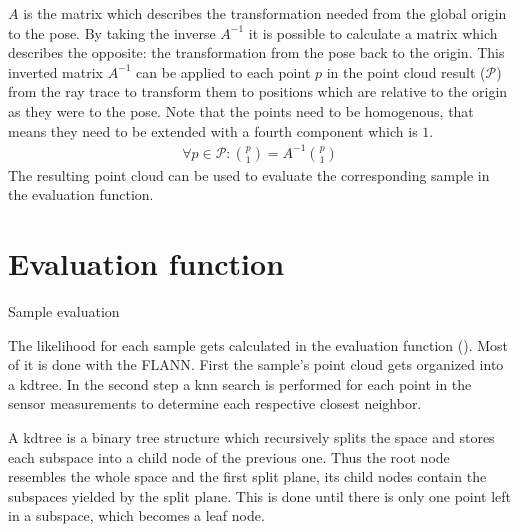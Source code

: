 \documentclass[Thesis.tex]{subfiles}
\begin{document}
$A$ is the matrix which describes the transformation needed from the global origin to the pose. By taking the inverse $A^{-1}$ it is possible to calculate a matrix which describes the opposite: the transformation from the pose back to the origin. This inverted matrix $A^{-1}$ can be applied to each point $p$ in the point cloud result ($\mathcal{P}$) from the ray trace to transform them to positions which are relative to the origin as they were to the pose. Note that the points need to be homogenous, that means they need to be extended with a fourth component which is $1$.
%
\begin{align}
  \forall p \in \mathcal{P}: \genfrac{(}{)}{0pt}{0}{p}{1} = A^{-1} \genfrac{(}{)}{0pt}{0}{p}{1}
\end{align}
%
The resulting point cloud can be used to evaluate the corresponding sample in the evaluation function.
%
%
%
\section{Evaluation function}
%
\begin{algorithm}[!htp]
\caption{Sample evaluation}
\label{alg:eval}

\end{algorithm}
The likelihood for each sample gets calculated in the evaluation function (). Most of it is done with the \gls{FLANN}. First the sample's point cloud gets organized into a \gls{kdtree}. In the second step a \gls{knn} search is performed for each point in the sensor measurements to determine each respective closest neighbor. 

A \gls{kdtree} is a binary tree structure which recursively splits the space and stores each subspace into a child node of the previous one. Thus the root node resembles the whole space and the first split plane, its child nodes contain the subspaces yielded by the split plane. This is done until there is only one point left in a subspace, which becomes a leaf node. 
\end{document}
